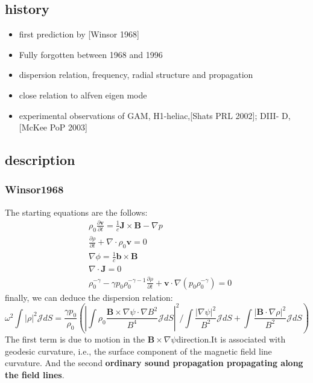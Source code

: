\documentclass[11pt,a4paper]{article}
\begin{document}
\subsection{history}
	\begin{itemize}
		\item first prediction by [Winsor 1968]
		\item Fully forgotten between 1968 and 1996
		\item dispersion relation, frequency, radial structure and propagation
		\item close relation to alfven eigen mode
		\item experimental observations of GAM, H1-heliac,[Shats PRL 2002]; DIII-
		D, [McKee PoP 2003]
	\end{itemize}
	
\subsection{description}
	\subsubsection{Winsor1968}
	The starting equations are the follows:
	\begin{equation}
	\begin{aligned}
		&\rho_0\frac{\partial{\pmb{v}}}{\partial{t}}=\frac{1}{c}\pmb{J}\times\pmb{B}-\nabla{p}	\\
		&\frac{\partial\rho}{\partial{t}}+\nabla\cdot\rho_0\pmb{v}=0	\\
		&\nabla\phi=\frac{1}{c}\pmb{b}\times\pmb{B}	\\
		&\nabla\cdot\pmb{J}=0	\\
		&\rho_0^{-\gamma}-\gamma{p_0}\rho_0^{-\gamma-1}\frac{\partial{\rho}}{\partial{t}}+\pmb{v}\cdot\nabla({p_0}\rho_0^{-\gamma})=0
	\end{aligned}
	\end{equation}	
	finally, we can deduce the dispersion relation:
	\begin{equation}
		\omega^2\int{|\rho|^2}\mathcal{J}dS=\frac{\gamma{p_0}}{\rho_0}
		( |\int\rho_0\frac{\pmb{B}\times\nabla\psi\cdot\nabla{B^2}}{B^4}\mathcal{J}dS|^2/\int\frac{|\nabla\psi|^2}{B^2}\mathcal{J}dS + \int\frac{|\pmb{B}\cdot\nabla\rho|^2}{B^2}\mathcal{J}dS )
	\end{equation}
	The first term is due to motion in the $\pmb{B}\times\nabla\psi$direction.It is associated with geodesic curvature, i.e., the surface component of the magnetic field line curvature. And the second \textbf{ordinary sound propagation propagating along the field lines}.
	
\end{document}
